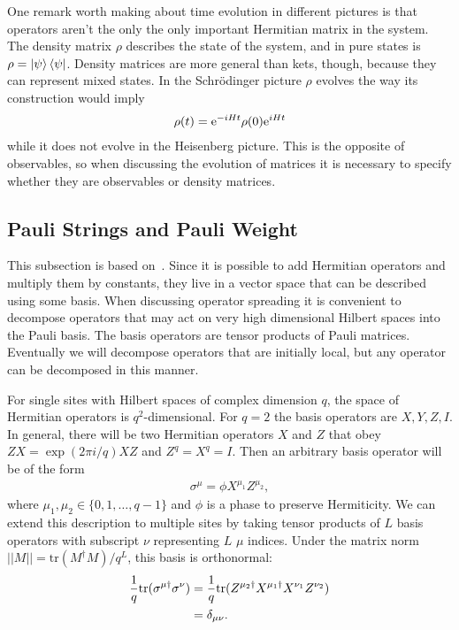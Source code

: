 One remark worth making about time evolution in different pictures is that operators aren't the only the only important Hermitian matrix in the system. The density matrix $\rho$ describes the state of the system, and in pure states is $\rho = \left|\psi\right\rangle\left\langle\psi\right|$. Density matrices are more general than kets, though, because they can represent mixed states. In the Schr\"odinger picture $\rho$ evolves the way its construction would imply
\begin{align}
\rho(t) = \text{e}^{-iHt}\rho(0)\text{e}^{iHt}
\end{align}
while it does not evolve in the Heisenberg picture. This is the opposite of observables, so when discussing the evolution of matrices it is necessary to specify whether they are observables or density matrices.

\subsection{Pauli Strings and Pauli Weight} \label{sub:pauli}

This subsection is based on~\cite{Keyserlingk}. Since it is possible to add Hermitian operators and multiply them by constants, they live in a vector space that can be described using some basis. When discussing operator spreading it is convenient to decompose operators that may act on very high dimensional Hilbert spaces into the Pauli basis. The basis operators are tensor products of Pauli matrices. Eventually we will decompose operators that are initially local, but any operator can be decomposed in this manner.

For single sites with Hilbert spaces of complex dimension $q$, the space of Hermitian operators is $q^2$-dimensional. For $q=2$ the basis operators are $X, Y, Z, I$. In general, there will be two Hermitian operators $X$ and $Z$ that obey $ZX = \exp(2\pi i/q)XZ$ and $Z^q=X^q=I$. Then an arbitrary basis operator will be of the form 
\begin{align}
\sigma^\mu = \phi X^{\mu_1}Z^{\mu_2},
\end{align}
where $\mu_1, \mu_2\in\{0,1,\dots,q-1\}$ and $\phi$ is a phase to preserve Hermiticity. We can extend this description to multiple sites by taking tensor products of $L$ basis operators with subscript $\nu$ representing $L$ $\mu$ indices. Under the matrix norm $||M|| = \text{tr}(M^\dag M)/q^L$, this basis is orthonormal:
\begin{align}
\frac{1}{q}\text{tr}(\sigma^{\mu\dag}\sigma^\nu) &= \frac{1}{q}\text{tr}(Z^{\mu_2\dag}
	X^{\mu_1\dag}X^{\nu_1}Z^{\nu_2})\nonumber\\
&= \delta_{\mu\nu}.\label{eqn:orthonorm}
\end{align}

